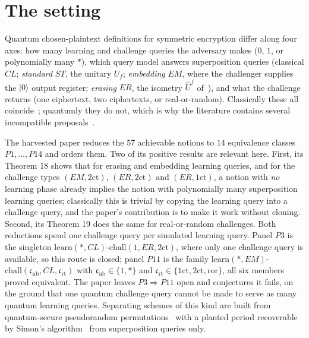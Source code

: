 \documentclass{aicr-conjecture}
\newcommand{\ror}{\mathrm{ror}}
\newcommand{\onect}{1\mathrm{ct}}
\newcommand{\twoct}{2\mathrm{ct}}
\newcommand{\learn}{\mathrm{learn}}
\newcommand{\chall}{\mathrm{chall}}
\newcommand{\cnb}{\mathfrak{c}_{\mathrm{nb}}}
\newcommand{\crt}{\mathfrak{c}_{\mathrm{rt}}}
\newcommand{\ket}[1]{|#1\rangle}
\newcommand{\NErOne}{\ensuremath{\learn(*,CL)}-\ensuremath{\chall(1,ER,\twoct)}}
\begin{document}
\section{The setting}\label{sec:setting}

Quantum chosen-plaintext definitions for symmetric encryption differ
along four axes: how many learning and challenge queries the adversary
makes ($0$, $1$, or polynomially many $*$), which query model answers
superposition queries (classical $CL$; \emph{standard} $ST$, the unitary
$U_f$; \emph{embedding} $EM$, where the challenger supplies the
$\ket{0}$ output register; \emph{erasing} $ER$, the isometry
$\hat U^{f}$ of~\cite{KKVB02}), and what the challenge returns (one
ciphertext, two ciphertexts, or real-or-random). Classically these all
coincide~\cite{BDJR97}; quantumly they do not, which is why the
literature contains several incompatible
proposals~\cite{BZ13b,GHS16,MS16}.

The harvested paper reduces the $57$ achievable notions to $14$
equivalence classes $P1,\dots,P14$ and orders them. Two of its positive
results are relevant here. First, its Theorem 18 shows that for erasing
and embedding learning queries, and for the challenge types
$(EM,\twoct)$, $(ER,\twoct)$ and $(ER,\onect)$, a notion with \emph{no}
learning phase already implies the notion with polynomially many
superposition learning queries; classically this is trivial by copying
the learning query into a challenge query, and the paper's contribution
is to make it work without cloning. Second, its Theorem 19 does the same
for real-or-random challenges. Both reductions spend one challenge query
per simulated learning query. Panel $P3$ is the singleton \NErOne,
where only one challenge query is available, so this route is closed;
panel $P11$ is the family $\learn(*,EM)$-$\chall(\cnb,CL,\crt)$ with
$\cnb\in\{1,*\}$ and $\crt\in\{\onect,\twoct,\ror\}$, all six members
proved equivalent. The paper leaves $P3\Rightarrow P11$ open and
conjectures it fails, on the ground that one quantum challenge query
cannot be made to serve as many quantum learning queries. Separating
schemes of this kind are built from quantum-secure pseudorandom
permutations~\cite{Zha16} with a planted period recoverable by Simon's
algorithm~\cite{Sim97} from superposition queries only.
\end{document}
